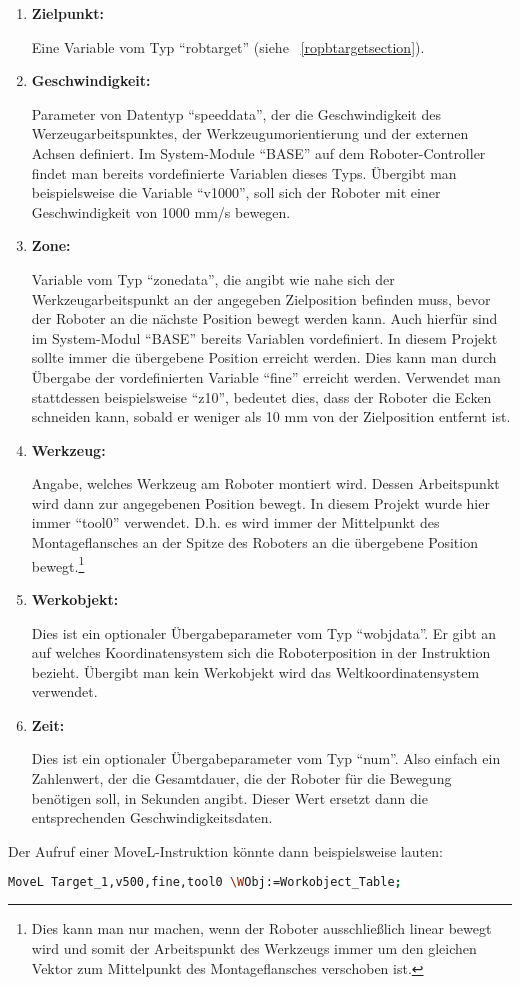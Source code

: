 \begin{enumerate}
\item \textbf{Zielpunkt:}

Eine Variable vom Typ \enquote{robtarget} (siehe ~\ref{ropbtargetsection}).
\item \textbf{Geschwindigkeit:}

Parameter von Datentyp \enquote{speeddata}, der die Geschwindigkeit des Werzeugarbeitspunktes, der Werkzeugumorientierung und der externen Achsen definiert. Im System-Module \enquote{BASE} auf dem Roboter-Controller findet man bereits vordefinierte Variablen dieses Typs. Übergibt man beispielsweise die Variable \enquote{v1000}, soll sich der Roboter mit einer Geschwindigkeit von 1000 mm/s bewegen. 
\item \textbf{Zone:}

Variable vom Typ \enquote{zonedata}, die angibt wie nahe sich der Werkzeugarbeitspunkt an der angegeben Zielposition befinden muss, bevor der Roboter an die nächste Position bewegt werden kann. Auch hierfür sind im System-Modul \enquote{BASE} bereits Variablen vordefiniert. In diesem Projekt sollte immer die übergebene Position erreicht werden. Dies kann man durch Übergabe der vordefinierten Variable \enquote{fine} erreicht werden. Verwendet man stattdessen beispielsweise \enquote{z10}, bedeutet dies, dass der Roboter die Ecken schneiden kann, sobald er weniger als 10 mm von der Zielposition entfernt ist.
\item \textbf{Werkzeug:}

Angabe, welches Werkzeug am Roboter montiert wird. Dessen Arbeitspunkt wird dann zur angegebenen Position bewegt. In diesem Projekt wurde hier immer \enquote{tool0} verwendet. D.h. es wird immer der Mittelpunkt des Montageflansches an der Spitze des Roboters an die übergebene Position bewegt.\footnote{Dies kann man nur machen, wenn der Roboter ausschließlich linear bewegt wird und somit der Arbeitspunkt des Werkzeugs immer um den gleichen Vektor zum Mittelpunkt des Montageflansches verschoben ist.}  
\item \textbf{Werkobjekt:}

Dies ist ein optionaler Übergabeparameter vom Typ \enquote{wobjdata}. Er gibt an auf welches Koordinatensystem sich die Roboterposition in der Instruktion bezieht. Übergibt man kein Werkobjekt wird das Weltkoordinatensystem verwendet. 
\item \textbf{Zeit:}

Dies ist ein optionaler Übergabeparameter vom Typ \enquote{num}. Also einfach ein Zahlenwert, der die Gesamtdauer, die der Roboter für die Bewegung benötigen soll,  in Sekunden angibt. Dieser Wert ersetzt dann die entsprechenden Geschwindigkeitsdaten.
\end{enumerate}

Der Aufruf einer MoveL-Instruktion könnte dann beispielsweise lauten:

\begin{lstlisting}[caption=Beispielaufruf der MoveL-Instruktion, label=movel, language=bash]
MoveL Target_1,v500,fine,tool0 \WObj:=Workobject_Table;
\end{lstlisting}